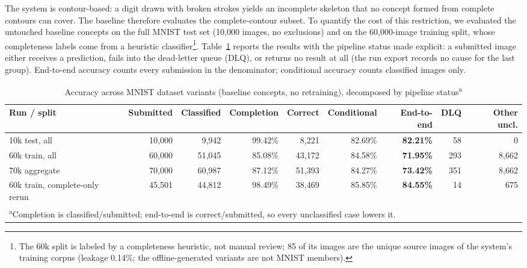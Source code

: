 \documentclass[conference]{IEEEtran}
\begin{document}
The system is contour-based: a digit drawn with broken strokes yields an
incomplete skeleton that no concept formed from complete contours can
cover. The baseline therefore evaluates the complete-contour subset. To
quantify the cost of this restriction, we evaluated the untouched baseline
concepts on the full MNIST test set (10{,}000 images, no
exclusions) and on the 60{,}000-image training split, whose
completeness labels come from a heuristic
classifier\footnote{The 60k split is labeled by a completeness heuristic,
not manual review; 85 of its images are the unique source images of the
system's training corpus (leakage 0.14\%; the offline-generated variants
are not MNIST members).}. Table~\ref{tab:datasets}
reports the results with the pipeline status made explicit: a submitted
image either receives a prediction, fails into the dead-letter queue
(DLQ), or returns no result at all (the run export records no cause for
the last group). End-to-end accuracy counts every submission in the
denominator; conditional accuracy counts classified images only.

\begin{table}[!t]
\caption{Accuracy across MNIST dataset variants (baseline concepts, no
retraining), decomposed by pipeline status\textsuperscript{a}}
\label{tab:datasets}
\centering
\begin{tabular}{lrrrrrrrr}
\toprule
Run / split & Submitted & Classified & Completion & Correct &
Conditional & End-to-end & DLQ & Other uncl. \\
\midrule
10k test, all & 10{,}000 & 9{,}942 & 99.42\% & 8{,}221 & 82.69\% & \textbf{82.21\%} & 58 & 0 \\
60k train, all & 60{,}000 & 51{,}045 & 85.08\% & 43{,}172 & 84.58\% & \textbf{71.95\%} & 293 & 8{,}662 \\
70k aggregate & 70{,}000 & 60{,}987 & 87.12\% & 51{,}393 & 84.27\% & \textbf{73.42\%} & 351 & 8{,}662 \\
60k train, complete-only rerun & 45{,}501 & 44{,}812 & 98.49\% & 38{,}469 & 85.85\% & \textbf{84.55\%} & 14 & 675 \\
\bottomrule
\multicolumn{9}{l}{\footnotesize\textsuperscript{a}Completion is
classified/submitted; end-to-end is correct/submitted, so every
unclassified case lowers it.}
\end{tabular}
\end{table}
\end{document}
